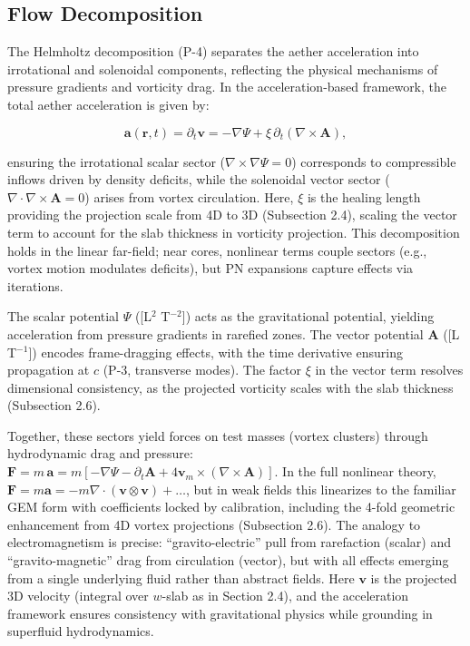 \documentclass{article}
\begin{document}
\subsection{Flow Decomposition}

The Helmholtz decomposition (P-4) separates the aether acceleration into irrotational and solenoidal components, reflecting the physical mechanisms of pressure gradients and vorticity drag. In the acceleration-based framework, the total aether acceleration is given by:

\[
\mathbf{a}(\mathbf{r}, t) = \partial_t \mathbf{v} = -\nabla \Psi + \xi \, \partial_t (\nabla \times \mathbf{A}),
\]

ensuring the irrotational scalar sector ($\nabla \times \nabla \Psi = 0$) corresponds to compressible inflows driven by density deficits, while the solenoidal vector sector ($\nabla \cdot \nabla \times \mathbf{A} = 0$) arises from vortex circulation. Here, $\xi$ is the healing length providing the projection scale from 4D to 3D (Subsection 2.4), scaling the vector term to account for the slab thickness in vorticity projection. This decomposition holds in the linear far-field; near cores, nonlinear terms couple sectors (e.g., vortex motion modulates deficits), but PN expansions capture effects via iterations.

The scalar potential $\Psi$ ([L$^2$ T$^{-2}$]) acts as the gravitational potential, yielding acceleration from pressure gradients in rarefied zones. The vector potential $\mathbf{A}$ ([L T$^{-1}$]) encodes frame-dragging effects, with the time derivative ensuring propagation at $c$ (P-3, transverse modes). The factor $\xi$ in the vector term resolves dimensional consistency, as the projected vorticity scales with the slab thickness (Subsection 2.6).

Together, these sectors yield forces on test masses (vortex clusters) through hydrodynamic drag and pressure: $\mathbf{F} = m \, \mathbf{a} = m [ -\nabla \Psi - \partial_t \mathbf{A} + 4 \mathbf{v}_m \times (\nabla \times \mathbf{A}) ]$. In the full nonlinear theory, $\mathbf{F} = m \mathbf{a} = -m \nabla \cdot (\mathbf{v} \otimes \mathbf{v}) + \dots$, but in weak fields this linearizes to the familiar GEM form with coefficients locked by calibration, including the 4-fold geometric enhancement from 4D vortex projections (Subsection 2.6). The analogy to electromagnetism is precise: ``gravito-electric'' pull from rarefaction (scalar) and ``gravito-magnetic'' drag from circulation (vector), but with all effects emerging from a single underlying fluid rather than abstract fields. Here $\mathbf{v}$ is the projected 3D velocity (integral over $w$-slab as in Section 2.4), and the acceleration framework ensures consistency with gravitational physics while grounding in superfluid hydrodynamics.
\end{document}
